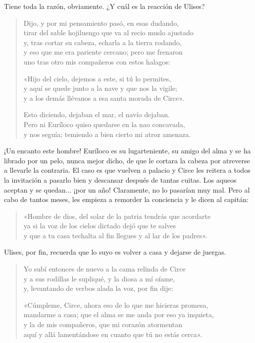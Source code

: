 \documentclass[11pt,a4paper]{article}
\begin{document}
Tiene toda la razón, obviamente. ¿Y cuál es la reacción de Ulises?

\begin{verse}
Dijo, y por mi pensamiento pasó, en esas dudando,\\
tirar del sable hojiluengo que va al recio muslo ajustado\\
y, tras cortar su cabeza, echarla a la tierra rodando,\\
y eso que me era pariente cercano; pero me frenaron\\
uno tras otro mis compañeros con estos halagos:

«Hijo del cielo, dejemos a este, si tú lo permites,\\
y aquí se quede junto a la nave y que nos la vigile;\\
y a los demás llévanos a esa santa morada de Circe».

Esto diciendo, dejaban el mar, el navío dejaban.\\
Pero ni Euríloco quiso quedarse en la nao concavada,\\
y nos seguía; temiendo a bien cierto mi atroz amenaza.
\end{verse}

¡Un encanto este hombre! Euríloco es su lugarteniente, su amigo del alma y se ha librado por un pelo, nunca mejor dicho, de que le cortara la cabeza por atreverse a llevarle la contraria. El caso es que vuelven a palacio y Circe les reitera a todos la invitación a pasarlo bien y descansar después de tantas cuitas. Los aqueos aceptan y se quedan... ¡por un año! Claramente, no lo pasarían muy mal. Pero al cabo de tantos meses, les empieza a remorder la conciencia y le dicen al capitán:

\begin{verse}
«Hombre de dios, del solar de la patria tendrás que acordarte\\
ya si la voz de los cielos dictado dejó que te salves\\
y que a tu casa techalta al fin llegues y al lar de los padres».
\end{verse}

Ulises, por fin, recuerda que lo suyo es volver a casa y dejarse de juergas.

\begin{verse}
Yo subí entonces de nuevo a la cama relinda de Circe\\
y a sus rodillas le supliqué, y la diosa a mí oíame,\\
y, levantando de verbos alada la voz, por fin dije:

«Cúmpleme, Circe, ahora eso de lo que me hicieras promesa,\\
mandarme a casa; que el alma se me anda por eso ya inquieta,\\
y la de mis compañeros, que mi corazón atormentan\\
aquí y allá lamentándose en cuanto que tú no estás cerca».
\end{verse}
\end{document}
